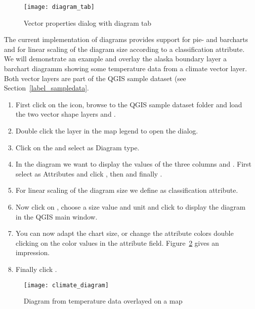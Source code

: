 \begin{figure}[ht]
   \begin{center}
   \caption{Vector properties dialog with diagram tab \nixcaption}\label{fig:diagramtab}\smallskip
   \texttt{[image: diagram\_tab]}
\end{center}
\end{figure}

The current implementation of diagrams provides support for pie- and barcharts
and for linear scaling of the diagram size according to a classification
attribute. We will demonstrate an example and overlay the alaska boundary
layer a barchart diagramm showing some temperature data from a climate vector
layer. Both vector layers are part of the QGIS sample dataset (see
Section~\ref{label_sampledata}.

\begin{enumerate}
\item First click on the  icon,
browse to the QGIS sample dataset folder and load the two vector shape layers
 and .
\item Double click the  layer in the map legend to open the
 dialog.
\item Click on the  and select  as
Diagram type.
\item In the diagram we want to display the values of the three columns
 and . First select
 as Attributes and click , then
 and finally .  
\item For linear scaling of the diagram size we define 
as classification attribute.
\item Now click on , choose a size value and unit
and click  to display the diagram in the QGIS main window.
\item You can now adapt the chart size, or change the attribute colors double
clicking on the color values in the attribute field.
Figure~\ref{fig:climatediagram} gives an impression.
\item Finally click . 
\end{enumerate}

\begin{figure}[ht]
   \begin{center}
   \caption{Diagram from temperature data overlayed on a map \nixcaption}\label{fig:climatediagram}\smallskip
   \texttt{[image: climate\_diagram]}
\end{center}
\end{figure}

